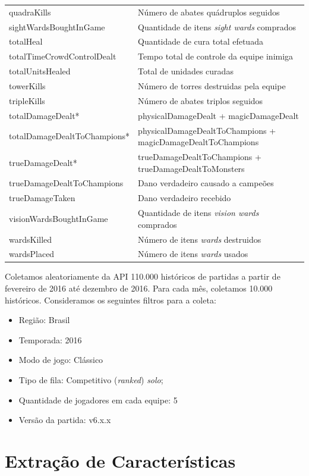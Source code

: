 \begin{table}
\begin{tabular}{p{}p{}}
quadraKills & Número de abates quádruplos seguidos\\
sightWardsBoughtInGame & Quantidade de itens \textit{sight wards} comprados\\
totalHeal & Quantidade de cura total efetuada\\
totalTimeCrowdControlDealt & Tempo total de controle da equipe inimiga\\
totalUnitsHealed & Total de unidades curadas\\
towerKills & Número de torres destruidas pela equipe\\
tripleKills & Número de abates triplos seguidos\\
totalDamageDealt* & physicalDamageDealt + magicDamageDealt \\
totalDamageDealtToChampions* & physicalDamageDealtToChampions + magicDamageDealtToChampions \\
 trueDamageDealt* & trueDamageDealtToChampions + trueDamageDealtToMonsters\\
trueDamageDealtToChampions & Dano verdadeiro causado a campeões\\
trueDamageTaken & Dano verdadeiro recebido\\
visionWardsBoughtInGame & Quantidade de itens \textit{vision wards} comprados\\
wardsKilled & Número de itens \textit{wards} destruidos\\
wardsPlaced & Número de itens \textit{wards} usados\\
  \bottomrule
\end{tabular}
\end{table}

Coletamos aleatoriamente da API 110.000 históricos de partidas a partir de fevereiro de 2016 até dezembro de 2016. Para cada mês, coletamos 10.000 históricos. Consideramos os seguintes filtros para a coleta: 

\begin{itemize}
  \item Região: Brasil
  \item Temporada: 2016
  \item Modo de jogo: Clássico
  \item Tipo de fila: Competitivo (\textit{ranked}) \textit{solo};
  \item Quantidade de jogadores em cada equipe: 5
  \item Versão da partida: v6.x.x
\end{itemize}

\section{Extração de Características}

